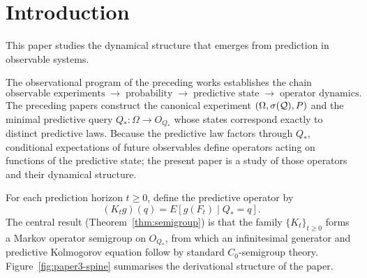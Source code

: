 
\maketitle

\begin{abstract}
This paper develops the operator theory of predictive dynamics
arising from observable experiments.  The predictive factorization
theorem of the preceding paper forces conditional expectations of future
observables to factor through a minimal predictive state space $Q_*$.
This paper shows that predictive evolution on $O_{Q_*}$ is represented
by a strongly continuous semigroup of Markov operators $\{K_t\}_{t\ge0}$,
studies its infinitesimal generator, and situates the construction
within classical Koopman and Markov operator theory.
\end{abstract}

\section{Introduction}

This paper studies the dynamical structure that emerges from prediction
in observable systems.

The observational program of the preceding works establishes the chain
\[
\text{observable experiments}
\;\rightarrow\;
\text{probability}
\;\rightarrow\;
\text{predictive state}
\;\rightarrow\;
\text{operator dynamics}.
\]
The preceding papers construct the canonical experiment $(\Omega,\sigma(\mathcal{Q}),P)$
and the minimal predictive query $Q_*:\Omega\to O_{Q_*}$ whose states
correspond exactly to distinct predictive laws.  Because the predictive
law factors through $Q_*$, conditional expectations of future observables
define operators acting on functions of the predictive state; the present
paper is a study of those operators and their dynamical structure.

For each prediction horizon $t\ge0$, define the predictive operator by
\[
(K_t g)(q)
=
E[g(F_t)\mid Q_*=q].
\]
The central result (Theorem~\ref{thm:semigroup}) is that the family
$\{K_t\}_{t\ge0}$ forms a Markov operator semigroup on $O_{Q_*}$,
from which an infinitesimal generator and predictive Kolmogorov
equation follow by standard $C_0$-semigroup theory.
Figure~\ref{fig:paper3-spine} summarises the derivational structure
of the paper.

